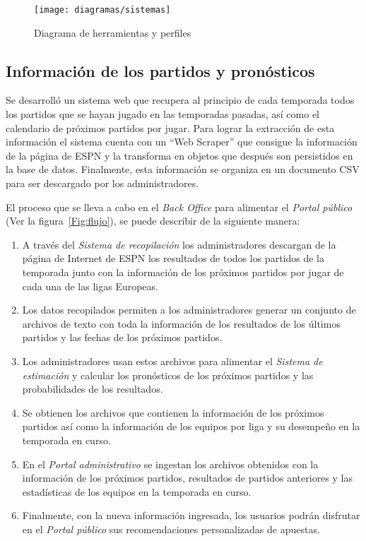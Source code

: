 \begin{figure}[!htb]\centering
   \begin {minipage}{1\textwidth}
     \texttt{[image: diagramas/sistemas]}
     \caption{Diagrama de herramientas y perfiles}\label{Fig:Sistemas}
   \end{minipage}
\end{figure}

\subsection{Información de los partidos y pronósticos}

Se desarrolló un sistema web que recupera al principio de cada temporada todos los partidos que se hayan jugado en las temporadas pasadas, así como el calendario de próximos partidos por jugar. Para lograr la extracción de esta información el sistema cuenta con un ``Web Scraper'' que consigue la información de la página de ESPN y la transforma en objetos que después son persistidos en la base de datos. Finalmente, esta información se organiza en un documento CSV para ser descargado por los administradores.

El proceso que se lleva a cabo en el \emph{Back Office} para alimentar el \emph{Portal público} (Ver la figura~\ref{Fig:flujo}), se puede describir de la siguiente manera:
\begin{enumerate}
	\item A través del \emph{Sistema de recopilación} los administradores descargan de la página de Internet de ESPN los resultados de todos los partidos de la temporada junto con la información de los próximos partidos por jugar  de cada una de las ligas Europeas.
	\item Los datos recopilados permiten a los administradores generar un conjunto de archivos de texto con toda la información de los resultados de los últimos partidos y las fechas de los próximos partidos.
	\item Los administradores usan estos archivos para alimentar el \emph{Sistema de estimación} y calcular los pronósticos de los próximos partidos y las probabilidades de los resultados.
	\item Se obtienen los archivos que contienen la información de los próximos partidos así como la información de los equipos por liga y su desempeño en la temporada en curso.
	\item En el \emph{Portal administrativo} se ingestan los archivos obtenidos con la información de los próximos partidos, resultados de partidos anteriores y las estadísticas de los equipos en la temporada en curso.
	\item Finalmente, con la nueva información ingresada, los usuarios podrán disfrutar en el \emph{Portal público} sus recomendaciones personalizadas de apuestas.
\end{enumerate}

